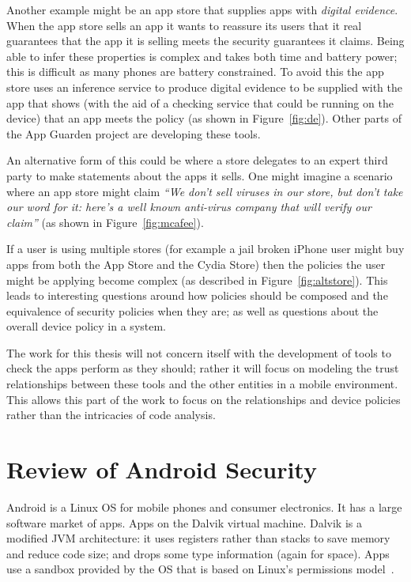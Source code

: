 \documentclass[a4paper]{article}
\begin{document}
Another example might be an app store that supplies apps with \emph{digital
evidence}.  When the app store sells an app it wants to reassure its users that
it real guarantees that the app it is selling meets the security guarantees it
claims.  Being able to infer these properties is complex and takes both time and
battery power; this is difficult as many phones are battery constrained.  To
avoid this the app store uses an inference service to produce digital evidence
to be supplied with the app that shows (with the aid of a checking service that
could be running on the device) that an app meets the policy (as shown in
Figure~\ref{fig:de}). Other parts of the App Guarden project are 
developing these tools.

An alternative form of this could be where a store delegates to an expert third
party to make statements about the apps it sells.  One might imagine a scenario
where an app store might claim \emph{``We don't sell viruses in our store, but
don't take our word for it: here's a well known anti-virus company that will
verify our claim''} (as shown in Figure~\ref{fig:mcafee}).

If a user is using multiple stores (for example a jail broken iPhone user might
buy apps from both the App Store and the Cydia Store) then the policies the user
might be applying become complex (as described in Figure~\ref{fig:altstore}).
This leads to interesting questions around how policies should be composed and
the equivalence of security policies when they are; as well as questions about
the overall device policy in a system.

The work for this thesis will not concern itself with the development of tools
to check the apps perform as they should; rather it will focus on modeling the
trust relationships between these tools and the other entities in a mobile
environment.  This allows this part of the work to focus on the relationships
and device policies rather than the intricacies of code analysis.


\section{Review of Android Security}

Android is a Linux OS for mobile phones and consumer electronics. It has a large
software market of apps. Apps on the Dalvik virtual machine.  Dalvik is a
modified JVM architecture: it uses registers rather than stacks to save memory
and reduce code size; and drops some type information (again for space).  Apps
use a sandbox provided by the OS that is based on Linux's permissions
model~\cite{Drake:2014uq}.
\end{document}
